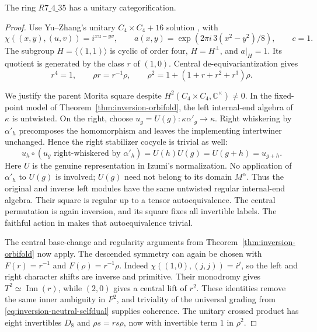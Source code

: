 \begin{theorem}\label{thm:inversion-v4}
The ring $R7\_4\_35$ has a unitary categorification.
\end{theorem}
\begin{proof}
Use Yu--Zhang's unitary $C_4\times C_4+16$ solution
\cite[Proposition~3.1 and Equation~(13)]{YuZhang}, with
\[
 \chi((x,y),(u,v))=i^{xu-yv},\qquad
 a(x,y)=\exp(2\pi i\,3(x^2-y^2)/8),\qquad c=1.
\]
The subgroup $H=\langle(1,1)\rangle$ is cyclic of order four,
$H=H^\perp$, and $a|_H=1$. Its quotient is generated by the class
$r$ of $(1,0)$. Central de-equivariantization gives
\begin{equation}\label{eq:inversion-neutral-selfdual}
 r^4=1,\qquad \rho r=r^{-1}\rho,\qquad
 \rho^2=1+(1+r+r^2+r^3)\rho.
\end{equation}

We justify the parent Morita square despite
$H^2(C_4\times C_4,\mathbb C^\times)\ne0$.
In the fixed-point model of Theorem~\ref{thm:inversion-orbifold},
the left internal-end algebra of $\kappa$ is untwisted. On the right,
choose $u_g=U(g):\kappa\alpha'_g\to\kappa$.
Right whiskering by $\alpha'_h$ precomposes the homomorphism and leaves
the implementing intertwiner unchanged. Hence the right stabilizer
cocycle is trivial as well:
\[
 u_h\circ(u_g\text{ right-whiskered by }\alpha'_h)
 =U(h)U(g)=U(g+h)=u_{g+h}.
\]
Here $U$ is the genuine representation in Izumi's normalization.
No application of $\alpha'_h$ to $U(g)$ is involved; $U(g)$ need not
belong to its domain $M^\alpha$.
Thus the original and inverse left modules have the same untwisted
regular internal-end algebra. Their square is regular up to a tensor
autoequivalence. The central permutation is again inversion, and its
square fixes all invertible labels. The faithful action in
\cite[Corollary~13.5]{IzumiNear} makes that autoequivalence trivial.

The central base-change and regularity arguments from
Theorem~\ref{thm:inversion-orbifold} now apply. The descended symmetry
can again be chosen with $F(r)=r^{-1}$ and $F(\rho)=r^{-1}\rho$.
Indeed $\chi((1,0),(j,j))=i^j$, so the left and right character
shifts are inverse and primitive. Their monodromy gives
$T^2\simeq\operatorname{Inn}(r)$, while $(2,0)$ gives a central
lift of $r^2$. These identities remove the same inner ambiguity in
$F^2$, and triviality of the universal grading from
\eqref{eq:inversion-neutral-selfdual} supplies coherence.
The unitary crossed product has eight invertibles $D_8$ and
$\rho s=rs\rho$, now with invertible term $1$ in $\rho^2$.


\end{proof}
